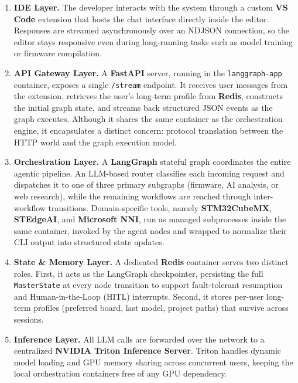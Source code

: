 \begin{enumerate}
    \item \textbf{IDE Layer.} The developer interacts with the system through a custom \textbf{VS Code} extension that hosts the chat interface directly inside the editor. Responses are streamed asynchronously over an NDJSON connection, so the editor stays responsive even during long-running tasks such as model training or firmware compilation.

    \item \textbf{API Gateway Layer.} A \textbf{FastAPI} server, running in the \texttt{langgraph-app} container, exposes a single \texttt{/stream} endpoint. It receives user messages from the extension, retrieves the user's long-term profile from \textbf{Redis}, constructs the initial graph state, and streams back structured JSON events as the graph executes. Although it shares the same container as the orchestration engine, it encapsulates a distinct concern: protocol translation between the HTTP world and the graph execution model.

    \item \textbf{Orchestration Layer.} A \textbf{LangGraph} stateful graph coordinates the entire agentic pipeline. An LLM-based router classifies each incoming request and dispatches it to one of three primary subgraphs (firmware, AI analysis, or web research), while the remaining workflows are reached through inter-workflow transitions. Domain-specific tools, namely \textbf{STM32CubeMX}, \textbf{STEdgeAI}, and \textbf{Microsoft NNI}, run as managed subprocesses inside the same container, invoked by the agent nodes and wrapped to normalize their CLI output into structured state updates.

    \item \textbf{State \& Memory Layer.} A dedicated \textbf{Redis} container serves two distinct roles. First, it acts as the LangGraph checkpointer, persisting the full \texttt{MasterState} at every node transition to support fault-tolerant resumption and Human-in-the-Loop (HITL) interrupts. Second, it stores per-user long-term profiles (preferred board, last model, project paths) that survive across sessions.

    \item \textbf{Inference Layer.} All LLM calls are forwarded over the network to a centralized \textbf{NVIDIA Triton Inference Server}. Triton handles dynamic model loading and GPU memory sharing across concurrent users, keeping the local orchestration containers free of any GPU dependency.
\end{enumerate}

